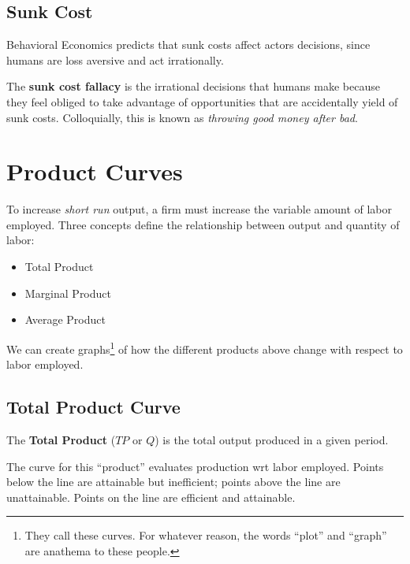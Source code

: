                 \subsection{Sunk Cost} %
                \label{sub:sunk_cost}
                    Behavioral Economics predicts that sunk costs affect actors decisions, since humans are loss aversive and act irrationally.

                    The \textbf{sunk cost fallacy} is the irrational decisions that humans make because they feel obliged to take advantage of opportunities that are accidentally yield of sunk costs.
                    Colloquially, this is known as \textit{throwing good money after bad}.
            \section{Product Curves} %
            \label{sec:product_curves}
                To increase \textit{short run} output, a firm must increase the variable amount of labor employed.
                Three concepts define the relationship between output and quantity of labor:
                \begin{itemize}
                    \item Total Product
                    \item Marginal Product
                    \item Average Product
                \end{itemize}
                We can create graphs\footnote{They call these curves.
                For whatever reason, the words ``plot'' and ``graph'' are anathema to these people.} of how the different products above change with respect to labor employed.
                \subsection{Total Product Curve} %
                \label{sub:total_product_curve}
                    The \textbf{Total Product} ($TP$ or $Q$) is the total output produced in a given period.

                    The curve for this ``product'' evaluates production wrt labor employed.
                    Points below the line are attainable but inefficient; points above the line are unattainable.
                    Points on the line are efficient and attainable.
